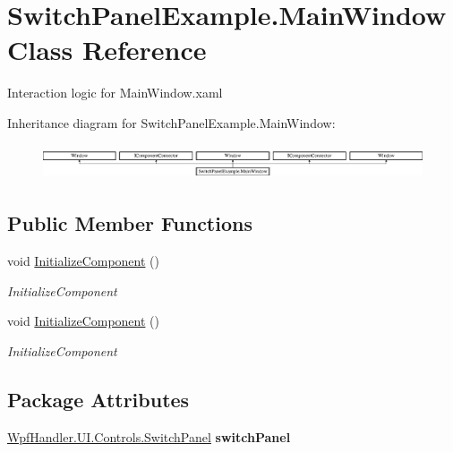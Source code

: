 \hypertarget{class_switch_panel_example_1_1_main_window}{}\section{Switch\+Panel\+Example.\+Main\+Window Class Reference}
\label{class_switch_panel_example_1_1_main_window}


Interaction logic for Main\+Window.\+xaml  


Inheritance diagram for Switch\+Panel\+Example.\+Main\+Window\+:\begin{figure}[H]
\begin{center}
\leavevmode
\includegraphics[height=1.056604cm]{df/d1f/class_switch_panel_example_1_1_main_window}
\end{center}
\end{figure}
\subsection*{Public Member Functions}
\begin{DoxyCompactItemize}
\item 
void \mbox{\hyperlink{class_switch_panel_example_1_1_main_window_a3d4e6b790ce13b64383a1c330cc19878}{Initialize\+Component}} ()
\begin{DoxyCompactList}\small\item\em Initialize\+Component \end{DoxyCompactList}\item 
void \mbox{\hyperlink{class_switch_panel_example_1_1_main_window_a3d4e6b790ce13b64383a1c330cc19878}{Initialize\+Component}} ()
\begin{DoxyCompactList}\small\item\em Initialize\+Component \end{DoxyCompactList}\end{DoxyCompactItemize}
\subsection*{Package Attributes}
\begin{DoxyCompactItemize}
\item 
\mbox{\label{class_switch_panel_example_1_1_main_window_a18526c158b329b88079752b7a72ae96e}} 
\mbox{\hyperlink{class_wpf_handler_1_1_u_i_1_1_controls_1_1_switch_panel}{Wpf\+Handler.\+U\+I.\+Controls.\+Switch\+Panel}} {\bfseries switch\+Panel}
\end{DoxyCompactItemize}
